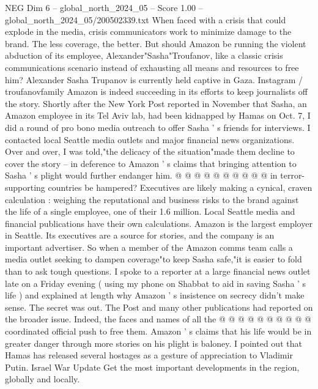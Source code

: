 \begin{textsample}{NEG Dim 6 – global\_north\_2024\_05 – Score 1.00 – global\_north\_2024\_05/200502339.txt}  \label{ex:f6_neg_302}
When faced with a crisis that could explode in the media, crisis communicators work to minimize damage to the brand.
The less coverage, the better.
But should Amazon be running the violent abduction of its employee, Alexander"Sasha"Troufanov, like a classic crisis communications scenario instead of exhausting all means and resources to free him?
Alexander Sasha Trupanov is currently held captive in Gaza.
Instagram / troufanovfamily Amazon is indeed succeeding in its efforts to keep journalists off the story.
Shortly after the New York Post reported in November that Sasha, an Amazon employee in its Tel Aviv lab, had been kidnapped by Hamas on Oct. 7, I did a round of pro bono media outreach to offer Sasha ' s friends for interviews.
I contacted local Seattle media outlets and major financial news organizations.
Over and over, I was told,"the delicacy of the situation"made them decline to cover the story -- in deference to Amazon ' s claims that bringing attention to Sasha ' s plight would further endanger him. @ @ @ @ @ @ @ @ @ @ in terror-supporting countries be hampered?
Executives are likely making a cynical, craven calculation : weighing the reputational and business risks to the brand against the life of a single employee, one of their 1.6 million.
Local Seattle media and financial publications have their own calculations.
Amazon is the largest employer in Seattle.
Its executives are a source for stories, and the company is an important advertiser.
So when a member of the Amazon comms team calls a media outlet seeking to dampen coverage"to keep Sasha safe,"it is easier to fold than to ask tough questions.
I spoke to a reporter at a large financial news outlet late on a Friday evening ( using my phone on Shabbat to aid in saving Sasha ' s life ) and explained at length why Amazon ' s insistence on secrecy didn't make sense.
The secret was out.
The Post and many other publications had reported on the broader issue.
Indeed, the faces and names of all the @ @ @ @ @ @ @ @ @ @ coordinated official push to free them.
Amazon ' s claims that his life would be in greater danger through more stories on his plight is baloney.
I pointed out that Hamas has released several hostages as a gesture of appreciation to Vladimir Putin.
Israel War Update Get the most important developments in the region, globally and locally.

\end{textsample}
